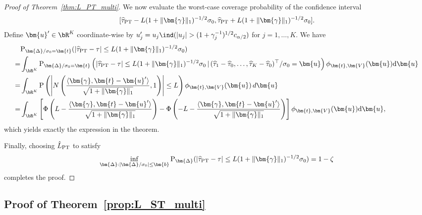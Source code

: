 \documentclass[11pt]{article}
\def\given{\,|\,}
\def\P{{\mathrm P}}
\def\d{{\mathrm d}}
\newcommand{\htau}{\widehat\tau}
\numberwithin{equation}{section}
\theoremstyle{definition}
\begin{document}
\begin{proof}[Proof of Theorem~\ref{thm:L_PT_multi}]
We now evaluate the worst-case coverage probability of the confidence interval
\[
  [\htau_{\rm PT} - L (1+\lVert \bm{\gamma} \rVert_1)^{-1/2} \sigma_0, \htau_{\rm PT} + L (1+\lVert \bm{\gamma} \rVert_1)^{-1/2} \sigma_0].
\]
Define $\bm{u}'\in\bR^K$ coordinate-wise by $u_j' = u_j \ind(\lvert u_j \rvert > (1+\gamma_j^{-1})^{1/2} c_{\alpha/2})$ for $j=1,\ldots,K$. We have
\begin{align*}
  &\P_{\bm{\Delta}/\sigma_0 = \bm{t}}(\lvert \htau_{\rm PT}- \tau \rvert \le L (1+\lVert \bm{\gamma} \rVert_1)^{-1/2} \sigma_0)\\
  =& \int_{\bR^K} \P_{\bm{\Delta}/\sigma_0 = \bm{t}}\left(\lvert \htau_{\rm PT}- \tau \rvert \le L (1+\lVert \bm{\gamma} \rVert_1)^{-1/2} \sigma_0 \given (\htau_1 - \htau_0, \ldots, \htau_K - \htau_0)^\top/\sigma_0 = \bm{u}\right) \phi_{\bm{t}, \bm{V}}(\bm{u}) \d \bm{u}\\
  =& \int_{\bR^K}
  \P\left(
    \left\lvert N\left(\frac{\langle \bm{\gamma},\bm{t}-\bm{u}'\rangle}{\sqrt{1+\lVert \bm{\gamma}\rVert_1}},1\right)\right\rvert
    \le L
  \right)
  \phi_{\bm{t},\bm{V}}(\bm{u})\,d\bm{u} \\
  =& \int_{\bR^K} \left[\Phi\left(L - \frac{\langle \bm{\gamma}, \bm{t} - \bm{u}' \rangle}{\sqrt{1+\lVert \bm{\gamma} \rVert_1}}  \right) - \Phi\left(-L - \frac{\langle \bm{\gamma}, \bm{t} - \bm{u}' \rangle}{\sqrt{1+\lVert \bm{\gamma} \rVert_1}} \right)\right] \phi_{\bm{t}, \bm{V}}(\bm{u}) \d \bm{u},
\end{align*}
which yields exactly the expression in the theorem.

Finally, choosing $\hat L_{\rm PT}$ to satisfy
\[
  \inf_{\bm{\Delta}: \lvert \bm{\Delta}/\sigma_0 \rvert \le \bm{b}} \P_{\bm{\Delta}}(\lvert \htau_{\rm PT}- \tau \rvert \le L (1+\lVert \bm{\gamma} \rVert_1)^{-1/2} \sigma_0) = 1-\zeta
\]
completes the proof.


\end{proof}

\subsection{Proof of Theorem~\ref{prop:L_ST_multi}}
\end{document}
